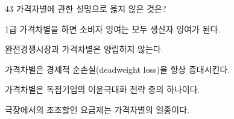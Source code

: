 \begin{question}{43}
가격차별에 관한 설명으로 옳지 않은 것은?
\begin{choices}
  \item 1급 가격차별을 하면 소비자 잉여는 모두 생산자 잉여가 된다.
  \item 완전경쟁시장과 가격차별은 양립하지 않는다.
  \item 가격차별은 경제적 순손실(deadweight loss)을 항상 증대시킨다.
  \item 가격차별은 독점기업의 이윤극대화 전략 중의 하나이다.
  \item 극장에서의 조조할인 요금제는 가격차별의 일종이다.
\end{choices}
\end{question}
